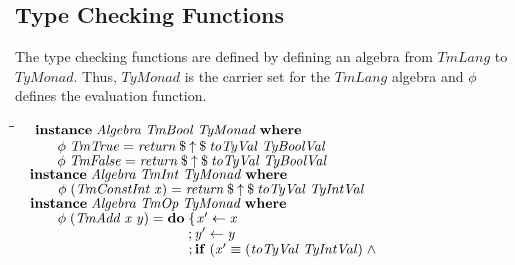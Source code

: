 \documentclass[10pt]{article}
\newlength{\lwidth}\setlength{\lwidth}{4.5cm}
\newlength{\cwidth}\setlength{\cwidth}{8mm} %
\newcommand{\Conid}[1]{\mathit{#1}}
\newcommand{\Varid}[1]{\mathit{#1}}
\begin{document}
\subsection{Type Checking Functions}

The type checking functions are defined by defining an algebra from
\ensuremath{\Conid{TmLang}} to \ensuremath{\Conid{TyMonad}}.  Thus, \ensuremath{\Conid{TyMonad}} is the carrier set for the
\ensuremath{\Conid{TmLang}} algebra and \ensuremath{\Varid{\phi}} defines the evaluation function.

\begin{tabbing}
\qquad\=\hspace{\lwidth}\=\hspace{\cwidth}\=\+\kill
${\hskip1.00em\relax\mathbf{instance}\;\Conid{Algebra}\;\Conid{TmBool}\;\Conid{TyMonad}\;\mathbf{where}}$\\
${\hskip1.00em\relax\hskip2.00em\relax\Varid{\phi}\;\Conid{TmTrue}\mathrel{=}\Varid{return}\mathbin{\$}\Varid{\uparrow}\mathbin{\$}\Varid{toTyVal}\;\Conid{TyBoolVal}}$\\
${\hskip1.00em\relax\hskip2.00em\relax\Varid{\phi}\;\Conid{TmFalse}\mathrel{=}\Varid{return}\mathbin{\$}\Varid{\uparrow}\mathbin{\$}\Varid{toTyVal}\;\Conid{TyBoolVal}}$\\
${}$\\
${\hskip1.00em\relax\mathbf{instance}\;\Conid{Algebra}\;\Conid{TmInt}\;\Conid{TyMonad}\;\mathbf{where}}$\\
${\hskip1.00em\relax\hskip2.00em\relax\Varid{\phi}\;(\Conid{TmConstInt}\;\Varid{x})\mathrel{=}\Varid{return}\mathbin{\$}\Varid{\uparrow}\mathbin{\$}\Varid{toTyVal}\;\Conid{TyIntVal}}$\\
${}$\\
${\hskip1.00em\relax\mathbf{instance}\;\Conid{Algebra}\;\Conid{TmOp}\;\Conid{TyMonad}\;\mathbf{where}}$\\
${\hskip1.00em\relax\hskip2.00em\relax\Varid{\phi}\;(\Conid{TmAdd}\;\Varid{x}\;\Varid{y})\mathrel{=}\mathbf{do}\;\{\mskip1.5mu \Varid{x'}\leftarrow \Varid{x}}$\\
${\hskip1.00em\relax\hskip2.00em\relax\phantom{\Varid{\phi}\;(\Conid{TmAdd}\;\Varid{x}\;\Varid{y})\mathrel{=}\mathbf{do}\;\mbox{}};\Varid{y'}\leftarrow \Varid{y}}$\\
${\hskip1.00em\relax\hskip2.00em\relax\phantom{\Varid{\phi}\;(\Conid{TmAdd}\;\Varid{x}\;\Varid{y})\mathrel{=}\mathbf{do}\;\mbox{}};\mathbf{if}\;(\Varid{x'}\equiv (\Varid{toTyVal}\;\Conid{TyIntVal})\mathrel{\wedge}}$\\

\end{tabbing}
\end{document}
